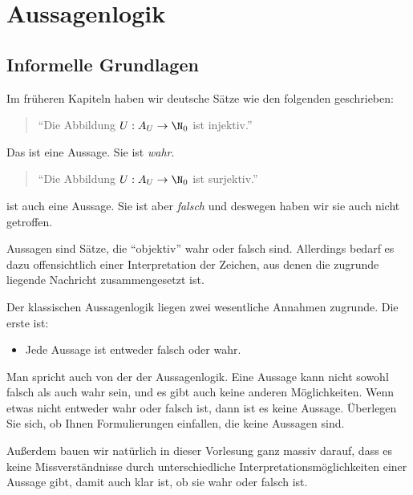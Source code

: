 \Tut\chapter{Aussagenlogik}
\label{k:aussagenlogik}

\Tut\section{Informelle Grundlagen}

Im früheren Kapiteln haben wir deutsche Sätze wie \zB den folgenden
geschrieben:
%
\begin{quote}
  "`Die Abbildung $U: A_U \to \N_0$ ist injektiv."'
\end{quote}
%
Das ist eine Aussage. Sie ist \emph{wahr}.
%
\begin{quote}
  "`Die Abbildung $U: A_U \to \N_0$ ist surjektiv."'
\end{quote}
%
ist auch eine Aussage. Sie ist aber \emph{falsch} und deswegen haben
wir sie auch nicht getroffen.

Aussagen sind Sätze, die "`objektiv"' wahr oder falsch
sind. 
%
Allerdings bedarf es dazu offensichtlich einer Interpretation der
Zeichen, aus denen die zugrunde liegende Nachricht zusammengesetzt
ist.

Der klassischen Aussagenlogik liegen zwei wesentliche Annahmen
zugrunde.
%
Die erste ist:
\begin{itemize}
\item  Jede Aussage ist entweder falsch oder wahr.
\end{itemize}
%
Man spricht auch von der %
 der Aussagenlogik.
%
Eine Aussage kann nicht sowohl falsch als auch wahr sein, und es gibt
auch keine anderen Möglichkeiten.
%
Wenn etwas nicht entweder wahr oder falsch ist, dann ist es keine Aussage.
% 
Überlegen Sie sich, ob Ihnen Formulierungen einfallen, die keine Aussagen sind.

Außerdem bauen wir natürlich in dieser Vorlesung ganz massiv darauf,
dass es keine Missverständnisse durch unterschiedliche
Interpretationsmöglichkeiten einer Aussage gibt, damit auch klar ist,
ob sie wahr oder falsch ist.
%

